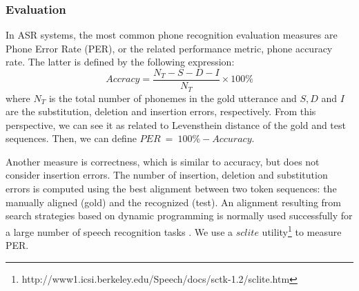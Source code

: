 \subsubsection{Evaluation}
\label{p-eval}
In ASR systems, the most common phone recognition evaluation measures are Phone Error Rate (PER), or the related performance metric, phone accuracy rate.
The latter is defined by the following expression:
\begin{equation}
Accracy = \frac{N_T - S - D - I}{N_T} \times 100\%
\end{equation}
where $N_T$ is the total number of phonemes in the gold utterance and $S, D$ and $I$ are the substitution, deletion and insertion errors, respectively.
From this perspective, we can see it as related to Levensthein distance of the gold and test sequences.
Then, we can define $PER \: = \: 100\% - Accuracy$.
\par
Another measure is correctness, which is similar to accuracy, but does not consider insertion errors.
The number of insertion, deletion and substitution errors is computed using the best alignment between two token sequences: the manually aligned (gold) and the recognized (test).
An alignment resulting from search strategies based on dynamic programming is normally used successfully for a large number of speech recognition tasks \cite{ney2000progress}.
We use a $sclite$ utility\footnote{http://www1.icsi.berkeley.edu/Speech/docs/sctk-1.2/sclite.htm} to measure PER.
